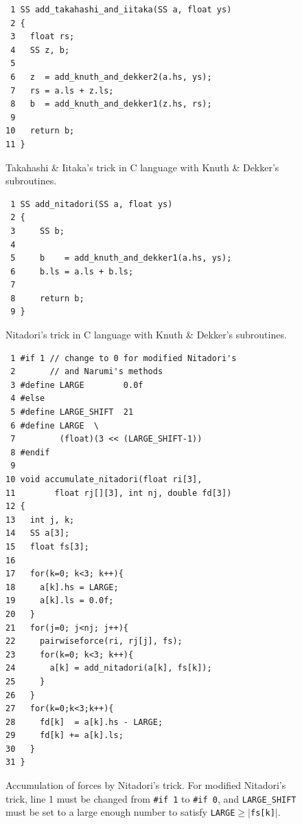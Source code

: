\begin{figure}
\begin{center}\footnotesize
\begin{minipage}{100mm}\def\baselinestretch{0.8}
\vspace*{-3mm}
\begin{verbatim}
 1 SS add_takahashi_and_iitaka(SS a, float ys)
 2 {
 3   float rs;
 4   SS z, b;
 5 
 6   z  = add_knuth_and_dekker2(a.hs, ys);
 7   rs = a.ls + z.ls;
 8   b  = add_knuth_and_dekker1(z.hs, rs);
 9 
10   return b;
11 }
\end{verbatim}\def\baselinestretch{1.0}
\end{minipage}
\caption{Takahashi \& Iitaka's trick in C language with Knuth \& Dekker's subroutines.}
\label{fig:TaI2}
\end{center}
\end{figure}

\begin{figure}
\begin{center}\footnotesize
\begin{minipage}{100mm}\def\baselinestretch{0.8}
\vspace*{-4mm}
\begin{verbatim}
 1 SS add_nitadori(SS a, float ys)
 2 {
 3     SS b;
 4 
 5     b    = add_knuth_and_dekker1(a.hs, ys);
 6     b.ls = a.ls + b.ls;
 7 
 8     return b;
 9 }
\end{verbatim}\def\baselinestretch{1.0}
\end{minipage}
\caption{Nitadori's trick in C language with Knuth \& Dekker's subroutines.}
\label{fig:Nitadori1}
\end{center}
\end{figure}

\begin{figure}
\begin{center}\footnotesize
\begin{minipage}{100mm}\def\baselinestretch{0.8}
\begin{verbatim}
 1 #if 1 // change to 0 for modified Nitadori's 
 2       // and Narumi's methods
 3 #define LARGE        0.0f
 4 #else
 5 #define LARGE_SHIFT  21
 6 #define LARGE  \
 7         (float)(3 << (LARGE_SHIFT-1))
 8 #endif
 9 
10 void accumulate_nitadori(float ri[3], 
11        float rj[][3], int nj, double fd[3])
12 {
13   int j, k;
14   SS a[3];
15   float fs[3];
16 
17   for(k=0; k<3; k++){
18     a[k].hs = LARGE;
19     a[k].ls = 0.0f;
20   }
21   for(j=0; j<nj; j++){
22     pairwiseforce(ri, rj[j], fs);
23     for(k=0; k<3; k++){
24       a[k] = add_nitadori(a[k], fs[k]);
25     }
26   }
27   for(k=0;k<3;k++){
28     fd[k]  = a[k].hs - LARGE;
29     fd[k] += a[k].ls;
30   }
31 }
\end{verbatim}\def\baselinestretch{1.0}
\end{minipage}
\caption{Accumulation of forces by Nitadori's trick.
For modified Nitadori's trick, line 1 must be 
changed from {\tt \#if 1} to {\tt \#if 0},
and {\tt LARGE\_SHIFT} must be set to a large enough 
number to satisfy {\tt LARGE}$\geq |${\tt fs[k]}$|$.}
\label{fig:Nitadori2}
\end{center}
\end{figure}

